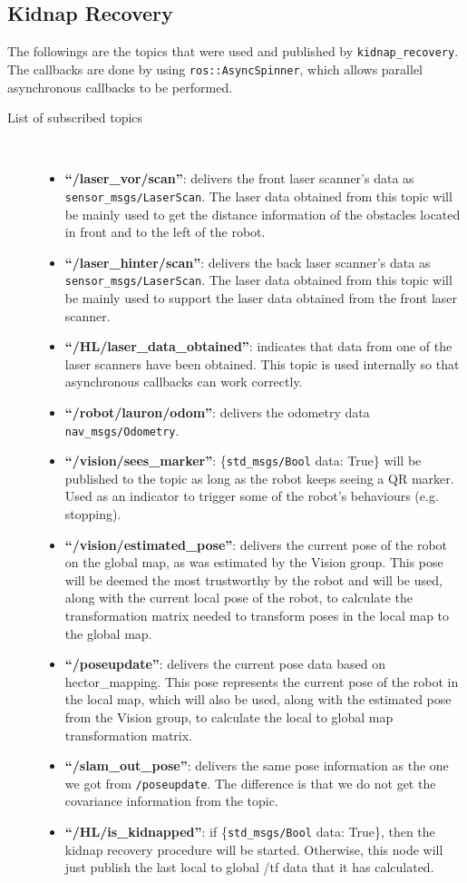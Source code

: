 \subsection{Kidnap Recovery}

The followings are the topics that were used and published by \texttt{kidnap\_recovery}. The callbacks are done by using \texttt{ros::AsyncSpinner}, which allows parallel asynchronous callbacks to be performed.

\begin{description}
\item[List of subscribed topics]\
	\begin{itemize}
	\item \textbf{``/laser\_vor/scan''}: delivers the front laser scanner's data as \texttt{sensor\_msgs/LaserScan}. The laser data obtained from this topic will be mainly used to get the distance information of the obstacles located in front and to the left of the robot.
	\item \textbf{``/laser\_hinter/scan''}: delivers the back laser scanner's data as \texttt{sensor\_msgs/LaserScan}. The laser data obtained from this topic will be mainly used to support the laser data obtained from the front laser scanner.
	\item \textbf{``/HL/laser\_data\_obtained''}: indicates that data from one of the laser scanners have been obtained. This topic is used internally so that asynchronous callbacks can work correctly.
	\item \textbf{``/robot/lauron/odom''}: delivers the odometry data \texttt{nav\_msgs/Odometry}.
	\item \textbf{``/vision/sees\_marker''}: \{\texttt{std\_msgs/Bool} data: True\} will be published to the topic as long as the robot keeps seeing a QR marker. Used as an indicator to trigger some of the robot's behaviours (e.g. stopping).
	\item \textbf{``/vision/estimated\_pose''}: delivers the current pose of the robot on the global map, as was estimated by the Vision group. This pose will be deemed the most trustworthy by the robot and will be used, along with the current local pose of the robot, to calculate the transformation matrix needed to transform poses in the local map to the global map.
	\item \textbf{``/poseupdate''}: delivers the current pose data based on hector\_mapping. This pose represents the current pose of the robot in the local map, which will also be used, along with the estimated pose from the Vision group, to calculate the local to global map transformation matrix.
	\item \textbf{``/slam\_out\_pose''}: delivers the same pose information as the one we got from \texttt{/poseupdate}. The difference is that we do not get the covariance information from the topic.
	\item \textbf{``/HL/is\_kidnapped''}: if \{\texttt{std\_msgs/Bool} data: True\}, then the kidnap recovery procedure will be started. Otherwise, this node will just publish the last local to global /tf data that it has calculated.
	\end{itemize}
\end{description}

